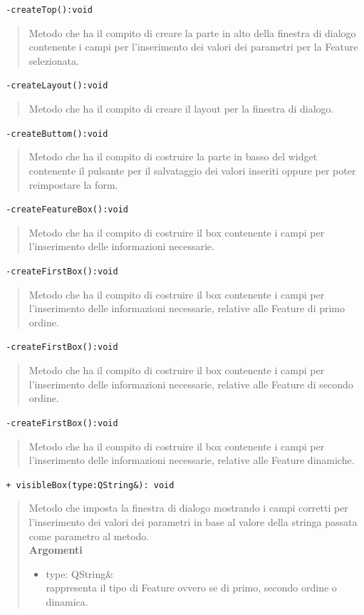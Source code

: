 \color{blue}\verb! -createTop():void!
\begin{quote}
\color{black} Metodo che ha il compito di creare la parte in alto della finestra di dialogo contenente i campi per l'inserimento dei valori dei parametri per la Feature\g{} selezionata.
\end{quote} 
\color{blue}\verb! -createLayout():void!
\begin{quote}
\color{black} Metodo che ha il compito di creare il layout per la finestra di dialogo.
\end{quote} 
\color{blue}\verb! -createButtom():void!
\color{black}
\begin{quote}
 Metodo che ha il compito di costruire la parte in basso del widget contenente il pulsante per il salvataggio dei valori inseriti oppure per poter reimpostare la form.
\end{quote}
\color{blue}\verb! -createFeatureBox():void!
\color{black}
\begin{quote}
 Metodo che ha il compito di costruire il box contenente i campi per l'inserimento delle informazioni necessarie.
\end{quote}
\color{blue}\verb! -createFirstBox():void!
\color{black}
\begin{quote}
 Metodo che ha il compito di costruire il box contenente i campi per l'inserimento delle informazioni necessarie, relative alle Feature\g{} di primo ordine.
\end{quote}
\color{blue}\verb! -createFirstBox():void!
\color{black}
\begin{quote}
 Metodo che ha il compito di costruire il box contenente i campi per l'inserimento delle informazioni necessarie, relative alle Feature\g{} di secondo ordine.
\end{quote}
\color{blue}\verb! -createFirstBox():void!
\color{black}
\begin{quote}
 Metodo che ha il compito di costruire il box contenente i campi per l'inserimento delle informazioni necessarie, relative alle Feature\g{} dinamiche.
\end{quote}

\color{blue}\verb! + visibleBox(type:QString&): void!
\color{black}
\begin{quote} Metodo che imposta la finestra di dialogo mostrando i campi corretti per l'inserimento dei valori dei parametri in base al valore della stringa passata come parametro al metodo.\\
\textbf{Argomenti}
\begin{itemize}
\item type: QString\& \\ rappresenta il tipo di Feature\g{} ovvero se di primo, secondo ordine o dinamica.
\end{itemize}
\end{quote}

